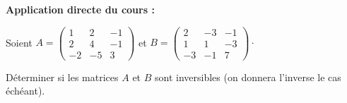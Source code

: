 \documentclass[french,11pt,twoside]{VcCours}
\newenvironment{ApplicationDirecte}{\textbf{Application directe du cours :}

}{}
\begin{document}
\begin{Exemple}
%
%

\newpage
\vspace*{3cm}
\end{Exemple}

\begin{ApplicationDirecte} Soient $A = \begin{pmatrix} 1 & 2 & -1\\
2 & 4 & -1\\
-2 & -5 & 3
\end{pmatrix}$ et $ B = \begin{pmatrix}
                   2 & -3 & -1\\
1 & 1 & -3\\
-3 & -1 & 7
                  \end{pmatrix}\cdot$
                  
Déterminer si les matrices $A$ et $B$ sont inversibles (on donnera l'inverse le cas échéant).
\end{ApplicationDirecte}
\end{document}
